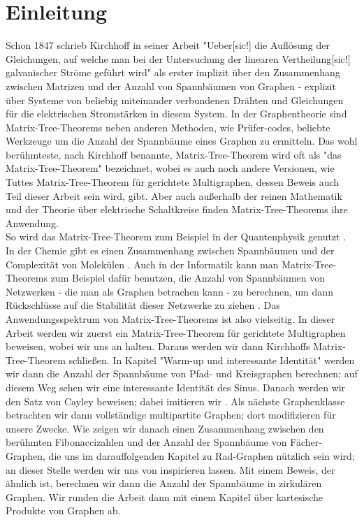 \section{Einleitung}
Schon 1847 schrieb Kirchhoff in seiner Arbeit "Ueber[sic!] die Auflösung der Gleichungen, auf welche man bei der Untersuchung der linearen Vertheilung[sic!] galvanischer Ströme geführt wird" \cite{kirchhoff_1847} als erster implizit über den Zusammenhang zwischen Matrizen und der Anzahl von Spannbäumen von Graphen - explizit über Systeme von beliebig miteinander verbundenen Drähten und Gleichungen für die elektrischen Stromstärken in diesem System.
In der Graphentheorie sind Matrix-Tree-Theorems neben anderen Methoden, wie Prüfer-codes, beliebte Werkzeuge um die Anzahl der Spannbäume eines Graphen zu ermitteln.
Das wohl berühmteste, nach Kirchhoff benannte, Matrix-Tree-Theorem wird oft als "das Matrix-Tree-Theorem" bezeichnet, wobei es auch noch andere Versionen, wie Tuttes Matrix-Tree-Theorem für gerichtete Multigraphen, dessen Beweis auch Teil dieser Arbeit sein wird, gibt.
Aber auch außerhalb der reinen Mathematik und der Theorie über elektrische Schaltkreise finden Matrix-Tree-Theorems ihre Anwendung.\\
So wird das Matrix-Tree-Theorem zum Beispiel in der Quantenphysik genutzt \cite{giovannetti_severini_2013}.
In der Chemie gibt es einen Zusammenhang zwischen Spannbäumen und der Complexität von Molekülen \cite{janezic_2015}.
Auch in der Informatik kann man Matrix-Tree-Theorems zum Beispiel dafür benutzen, die Anzahl von Spannbäumen von Netzwerken - die man als Graphen betrachen kann - zu berechnen, um dann Rück\-schlüsse auf die Stabilität dieser Netzwerke zu ziehen \cite{yakoubi_2019}.
Das Anwendungsspektrum von Matrix-Tree-Theorems ist also vielseitig.
In dieser Arbeit werden wir zuerst ein Matrix-Tree-Theorem für gerichtete Multigraphen beweisen, wobei wir uns an \cite{bang-jensen_2009} halten. Daraus werden wir dann Kirchhoffs Matrix-Tree-Theorem schließen. In Kapitel "Warm-up und interessante Identität" werden wir dann die Anzahl der Spannbäume von Pfad- und Kreisgraphen berechnen; auf diesem Weg sehen wir eine interessante Identität des Sinus. Danach werden wir den Satz von Cayley beweisen; dabei imitieren wir \cite{Lau_2004}.
Als nächste Graphenklasse betrachten wir dann vollständige multipartite Graphen; dort modifizieren \cite{austin_1960} für unsere Zwecke. Wie \cite{bogdanowicz_2008} zeigen wir danach einen Zusammenhang zwischen den berühmten Fibonaccizahlen und der Anzahl der Spannbäume von Fächer-Graphen, die uns im darauffolgenden Kapitel zu Rad-Graphen nützlich sein wird; an dieser Stelle werden wir uns von \cite{sedlacek_1970} inspirieren lassen. 
Mit einem Beweis, der \cite{wang_yang_1984} ähnlich ist, berechnen wir dann die Anzahl der Spannbäume in zirkulären Graphen. Wir runden die Arbeit dann mit einem Kapitel über kartesische Produkte von Graphen ab. 

